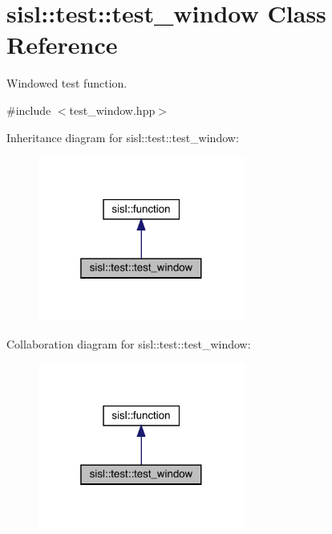 \hypertarget{classsisl_1_1test_1_1test__window}{}\section{sisl\+:\+:test\+:\+:test\+\_\+window Class Reference}
\label{classsisl_1_1test_1_1test__window}


Windowed test function.  




{\ttfamily \#include $<$test\+\_\+window.\+hpp$>$}



Inheritance diagram for sisl\+:\+:test\+:\+:test\+\_\+window\+:\nopagebreak
\begin{figure}[H]
\begin{center}
\leavevmode
\includegraphics[width=193pt]{classsisl_1_1test_1_1test__window__inherit__graph}
\end{center}
\end{figure}


Collaboration diagram for sisl\+:\+:test\+:\+:test\+\_\+window\+:\nopagebreak
\begin{figure}[H]
\begin{center}
\leavevmode
\includegraphics[width=193pt]{classsisl_1_1test_1_1test__window__coll__graph}
\end{center}
\end{figure}
